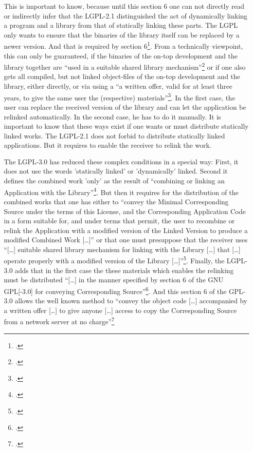 \begin{itemize}
  This is important to know, because until this section 6 one can not directly
  read or indirectly infer that the LGPL-2.1 distinguished the act of
  dynamically linking a program and a library from that of statically linking
  these parts. The LGPL only wants to ensure that the binaries of the library
  itself can be replaced by a newer version. And that is required by section
  6\footcite[cf.][\nopage wp.\ §6]{Lgpl21OsiLicense1999a}.
  From a technically viewpoint, this can only be guaranteed, if the binaries of
  the on-top development and the library together are \enquote{used in a
  suitable shared library mechanism}\footcite[cf.][\nopage wp.\
  §6]{Lgpl21OsiLicense1999a} or if one also gets all compiled, but not linked
  object-files of the on-top development and the library, either directly, or
  via using a \enquote{a written offer, valid for at least three years, to give
  the same user the (respective) materials}\footcite[cf.][\nopage wp.\
  §6]{Lgpl21OsiLicense1999a}. In the first case, the user can replace the
  received version of the library and can let the application be relinked
  automatically. In the second case, he has to do it manually. It is important
  to know that these ways exist if one wants or must distribute statically
  linked works. The LGPL-2.1 does not forbid to distribute statically linked
  applications. But it requires to enable the receiver to relink the work.
  
  The LGPL-3.0 has reduced these complex conditions in a special way: First, it
  does not use the words 'statically linked' or 'dynamically' linked. Second it
  defines the combined work 'only' as the result of \enquote{combining or
  linking an Application with the Library}\footcite[cf.][\nopage wp.\
  §0]{Lgpl30OsiLicense2007a}. But then it requires for the distribution of the
  combined works that one has either to \enquote{convey the Minimal
  Corresponding Source under the terms of this License, and the Corresponding
  Application Code in a form suitable for, and under terms that permit, the user
  to recombine or relink the Application with a modified version of the Linked
  Version to produce a modified Combined Work [\ldots]} or that one must
  presuppose that the receiver uses \enquote{[\ldots] suitable shared library
  mechanism for linking with the Library [\ldots] that [\ldots] operate properly
  with a modified version of the Library [\ldots]}\footcite[cf.][\nopage wp.\
  §4]{Lgpl30OsiLicense2007a}. Finally, the LGPL-3.0 adds that in the first case
  the these materials which enables the relinking must be distributed
  \enquote{[\ldots] in the manner specified by section 6 of the GNU GPL[-3.0]
  for conveying Corresponding Source}\footcite[cf.][\nopage wp.\
  §4]{Lgpl30OsiLicense2007a}. And this section 6 of the GPL-3.0 allows the well
  known method to \enquote{convey the object code [\ldots] accompanied by a
  written offer [\ldots] to give anyone [\ldots] access to copy the
  Corresponding Source from a network server at no charge}\footcite[cf.][\nopage
  wp.\ §6]{Gpl30OsiLicense2007a}


\end{itemize}
